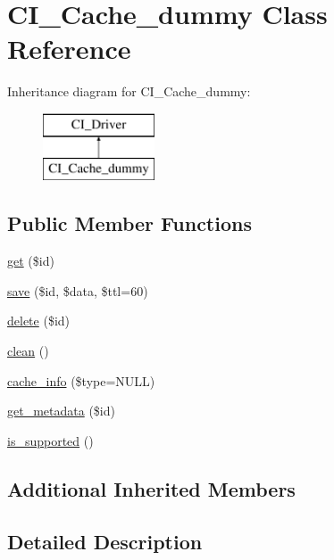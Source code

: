 \hypertarget{class_c_i___cache__dummy}{\section{C\-I\-\_\-\-Cache\-\_\-dummy Class Reference}
\label{class_c_i___cache__dummy}
}
Inheritance diagram for C\-I\-\_\-\-Cache\-\_\-dummy\-:\begin{figure}[H]
\begin{center}
\leavevmode
\includegraphics[height=2.000000cm]{class_c_i___cache__dummy}
\end{center}
\end{figure}
\subsection*{Public Member Functions}
\begin{DoxyCompactItemize}
\item 
\hyperlink{class_c_i___cache__dummy_a50e3bfb586b2f42932a6a93f3fbb0828}{get} (\$id)
\item 
\hyperlink{class_c_i___cache__dummy_a747c50183a4ed7009899628fa75c562b}{save} (\$id, \$data, \$ttl=60)
\item 
\hyperlink{class_c_i___cache__dummy_a2f8258add505482d7f00ea26493a5723}{delete} (\$id)
\item 
\hyperlink{class_c_i___cache__dummy_adb40b812890a8bc058bf6b7a0e1a54d9}{clean} ()
\item 
\hyperlink{class_c_i___cache__dummy_aa8b9c4d9f0387156736ccd8850f0727e}{cache\-\_\-info} (\$type=N\-U\-L\-L)
\item 
\hyperlink{class_c_i___cache__dummy_a59635cf18e997c5141bffa05ff7622e0}{get\-\_\-metadata} (\$id)
\item 
\hyperlink{class_c_i___cache__dummy_a98c68fd153468bc148c4ed8c716859fc}{is\-\_\-supported} ()
\end{DoxyCompactItemize}
\subsection*{Additional Inherited Members}


\subsection{Detailed Description}


